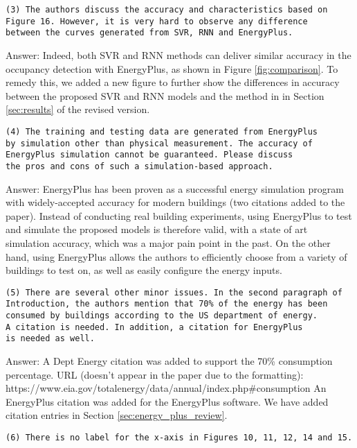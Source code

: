 \begin{verbatim}
(3) The authors discuss the accuracy and characteristics based on
Figure 16. However, it is very hard to observe any difference
between the curves generated from SVR, RNN and EnergyPlus.
\end{verbatim}

Answer: Indeed, both SVR and RNN methods can deliver similar accuracy in the occupancy detection with EnergyPlus,
as shown in Figure \ref{fig:comparison}. To remedy this, we added a new figure to further show the differences in accuracy between the proposed SVR and RNN models and the method in \cite{dong2014real} in Section \ref{sec:results} of the revised version. 

\begin{verbatim}
(4) The training and testing data are generated from EnergyPlus
by simulation other than physical measurement. The accuracy of
EnergyPlus simulation cannot be guaranteed. Please discuss
the pros and cons of such a simulation-based approach.
\end{verbatim}

Answer: EnergyPlus has been proven as a successful energy simulation program with
widely-accepted accuracy for modern buildings (two citations added to the
paper).  Instead of conducting real building experiments, using EnergyPlus to
test and simulate the proposed models is therefore valid, with a state of art
simulation accuracy, which was a major pain point in the past. On the other
hand, using EnergyPlus allows the authors to efficiently choose from a variety
of buildings to test on, as well as easily configure the energy inputs.

\begin{verbatim}
(5) There are several other minor issues. In the second paragraph of
Introduction, the authors mention that 70% of the energy has been
consumed by buildings according to the US department of energy.
A citation is needed. In addition, a citation for EnergyPlus
is needed as well.
\end{verbatim}

Answer: A Dept Energy citation was added to support the 70\% consumption
percentage.  URL (doesn't appear in the paper due to the formatting):
https://www.eia.gov/totalenergy/data/annual/index.php\#consumption An
EnergyPlus citation was added for the EnergyPlus software. We have added
citation entries in Section \ref{sec:energy_plus_review}.

\begin{verbatim}
(6) There is no label for the x-axis in Figures 10, 11, 12, 14 and 15.
\end{verbatim}

